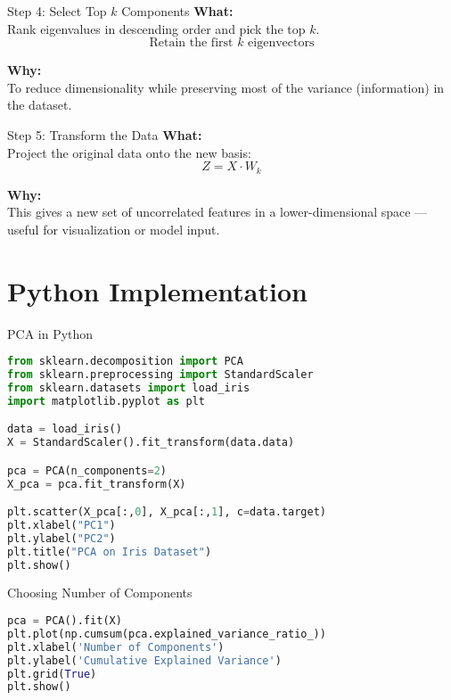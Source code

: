 \documentclass{beamer}
\begin{document}
\begin{frame}{Step 4: Select Top \( k \) Components}
\small
\textbf{What:} \\
Rank eigenvalues in descending order and pick the top \( k \). \\
\[
\text{Retain the first } k \text{ eigenvectors}
\]

\vspace{1em}
\textbf{Why:} \\
To reduce dimensionality while preserving most of the variance (information) in the dataset.
\end{frame}

\begin{frame}{Step 5: Transform the Data}
\small
\textbf{What:} \\
Project the original data onto the new basis: \\
\[
Z = X \cdot W_k
\]

\vspace{1em}
\textbf{Why:} \\
This gives a new set of uncorrelated features in a lower-dimensional space — useful for visualization or model input.
\end{frame}

\section{Python Implementation}
\begin{frame}[fragile]{PCA in Python}
    \small
\begin{lstlisting}[language=Python]
from sklearn.decomposition import PCA
from sklearn.preprocessing import StandardScaler
from sklearn.datasets import load_iris
import matplotlib.pyplot as plt

data = load_iris()
X = StandardScaler().fit_transform(data.data)

pca = PCA(n_components=2)
X_pca = pca.fit_transform(X)

plt.scatter(X_pca[:,0], X_pca[:,1], c=data.target)
plt.xlabel("PC1")
plt.ylabel("PC2")
plt.title("PCA on Iris Dataset")
plt.show()
\end{lstlisting}
\end{frame}

\begin{frame}[fragile]{Choosing Number of Components}
    \small
\begin{lstlisting}[language=Python]
pca = PCA().fit(X)
plt.plot(np.cumsum(pca.explained_variance_ratio_))
plt.xlabel('Number of Components')
plt.ylabel('Cumulative Explained Variance')
plt.grid(True)
plt.show()
\end{lstlisting}
\end{frame}
\end{document}
